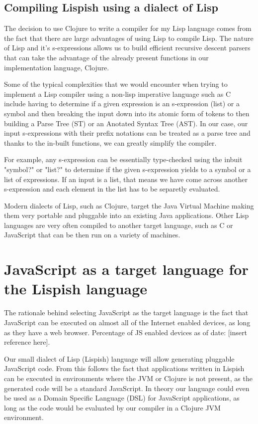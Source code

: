 \subsection{Compiling Lispish using a dialect of Lisp}
The decision to use Clojure to write a compiler for my Lisp language comes from the fact that there are large advantages of using Lisp to compile Lisp.
The nature of Lisp and it's s-expressions allows us to build efficient recursive descent parsers that can take the advantage of the already present functions in our implementation language, Clojure.

Some of the typical complexities that we would encounter when trying to implement a Lisp compiler using a non-lisp imperative language such as C include having to determine if a given expression is an s-expression (list) or a symbol and then breaking the input down into its atomic form of tokens to then building a Parse Tree (ST) or an Anotated Syntax Tree (AST).
In our case, our input s-expressions with their prefix notations can be treated as a parse tree and thanks to the in-built functions, we can greatly simplify the compiler.

For example, any s-expression can be essentially type-checked using the inbuit "symbol?" or "list?" to determine if the given s-expression yields to a symbol or a list of expressions. If an input is a list, that means we have come across another s-expression and each element in the list has to be separetly evaluated.

Modern dialects of Lisp, such as Clojure, target the Java Virtual Machine making them very portable and pluggable into an existing Java applications.
Other Lisp languages are very often compiled to another target language, such as C or JavaScript that can be then run on a variety of machines.

\section{JavaScript as a target language for the Lispish language}
The rationale behind selecting JavaScript as the target language is the fact that JavaScript can be executed on almost all of the Internet enabled devices, as long as they have a web browser. Percentage of JS enabled devices as of date: [insert reference here].

Our small dialect of Lisp (Lispish) language will allow generating pluggable JavaScript code.
From this follows the fact that applications written in Lispish can be executed in environments where the JVM or Clojure is not present, as the generated code will be a standard JavaScript.
In theory our language could even be used as a Domain Specific Language (DSL) for JavaScript applications, as long as the code would be evaluated by our compiler in a Clojure JVM environment.

